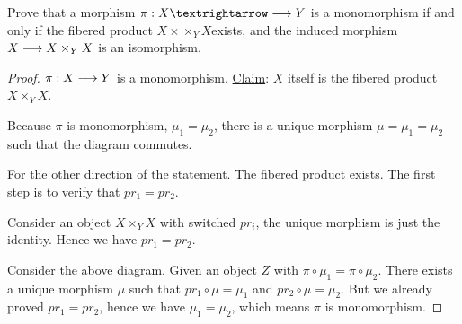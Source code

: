 \documentclass[11pt,fleqn]{book} %
\begin{document}
\begin{exr}
Prove that a morphism $\pi: X →\lrta Y$ is a monomorphism if and only if the fibered product $X ×\times_Y X $exists, and the induced morphism $X \longrightarrow  X \times_Y X$ is an isomorphism.
\end{exr}
\begin{proof}
$\pi:X\longrightarrow Y$ is a monomorphism. \underline{Claim}: $X$ itself is the fibered product $X\times_Y X$.
\begin{center}
\end{center}
Because $\pi$ is monomorphism, $\mu_1=\mu_2$, there is a unique morphism $\mu=\mu_1=\mu_2$ such that the diagram commutes.

For the other direction of the statement. The fibered product exists. The first step is to verify that $pr_1=pr_2$.
\begin{center}
\end{center}
Consider an object $X\times_Y X$ with switched $pr_i$, the unique morphism is just the identity. Hence we have $pr_1=pr_2$.

\begin{center}
\end{center}
Consider the above diagram. Given an object $Z$ with $\pi\circ\mu_1=\pi\circ \mu_2$. There exists a unique morphism $\mu$ such that $pr_1\circ\mu=\mu_1$ and $pr_2\circ \mu=\mu_2$. But we already proved $pr_1=pr_2$, hence we have $\mu_1=\mu_2$, which means $\pi$ is monomorphism.
\end{proof}
\end{document}
